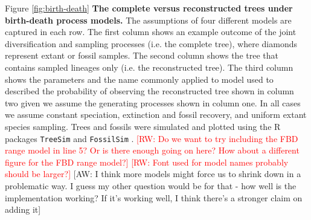 \documentclass[11pt]{article}
\newcommand{\rw}[1]{{\textcolor{red}{[RW: #1]}}} %
\newcommand{\aw}[1]{{\textcolor{armygreen}{[AW: #1]}}} %
\begin{document}
Figure \ref{fig:birth-death} \textbf{The complete versus reconstructed trees under birth-death process models.}
The assumptions of four different models are captured in each row.
The first column shows an example outcome of the joint diversification and sampling processes (i.e. the complete tree), where diamonds represent  extant or fossil samples.
The second column shows the tree that contains sampled lineages only (i.e. the reconstructed tree). 
The third column shows the parameters and the name commonly applied to model used to described the probability of observing the reconstructed tree shown in column two given we assume the generating processes shown in column one.
In all cases we assume constant speciation, extinction and fossil recovery, and uniform extant species sampling.
Trees and fossils were simulated and plotted using the R packages \texttt{TreeSim} \cite{Stadler2011} and \texttt{FossilSim} \cite{BaridoSottani2019b}.
\rw{Do we want to try including the FBD range model in line 5? Or is there enough going on here? How about a different figure for the FBD range model?}
\rw{Font used for model names probably should be larger?}
\aw{I think more models might force us to shrink down in a problematic way. I guess my other question would be for that - how well is the implementation working? If it's working well, I think there's a stronger claim on adding it}




\end{document}
